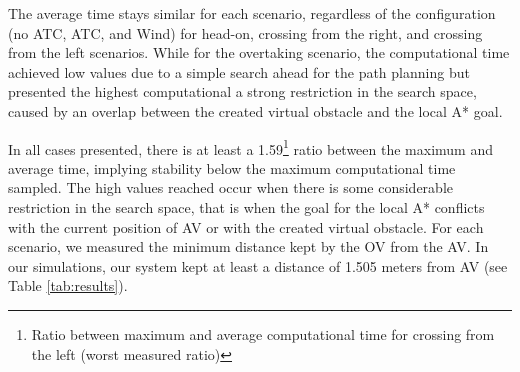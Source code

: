         The average time stays similar for each scenario, regardless of the configuration (no \ac{ATC}, \ac{ATC}, and Wind) for head-on, crossing from the right, and crossing from the left scenarios. While for the overtaking scenario, the computational time achieved low values due to a simple search ahead for the path planning but presented the highest computational a strong restriction in the search space, caused by an overlap between the created virtual obstacle and the local A* goal.
        
        In all cases presented, there is at least a 1.59\footnote{Ratio between maximum and average computational time for crossing from the left (worst measured ratio)} ratio between the maximum and average time, implying stability below the maximum computational time sampled. The high values reached occur when there is some considerable restriction in the search space, that is when the goal for the local A* conflicts with the current position of \ac{AV} or with the created virtual obstacle. For each scenario, we measured the minimum distance kept by the \ac{OV} from the \ac{AV}. In our simulations, our system kept at least a distance of 1.505 meters from \ac{AV} (see Table \ref{tab:results}). 
        
        
        
        

